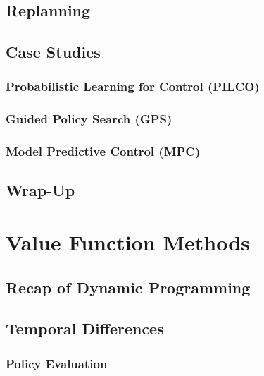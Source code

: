 	\section{Replanning} %

	\section{Case Studies} %

		\subsection{Probabilistic Learning for Control (PILCO)} %

		\subsection{Guided Policy Search (GPS)} %

		\subsection{Model Predictive Control (MPC)} %

	\section{Wrap-Up} %

\chapter{Value Function Methods} %

	\section{Recap of Dynamic Programming} %

	\section{Temporal Differences} %

		\subsection{Policy Evaluation} %

